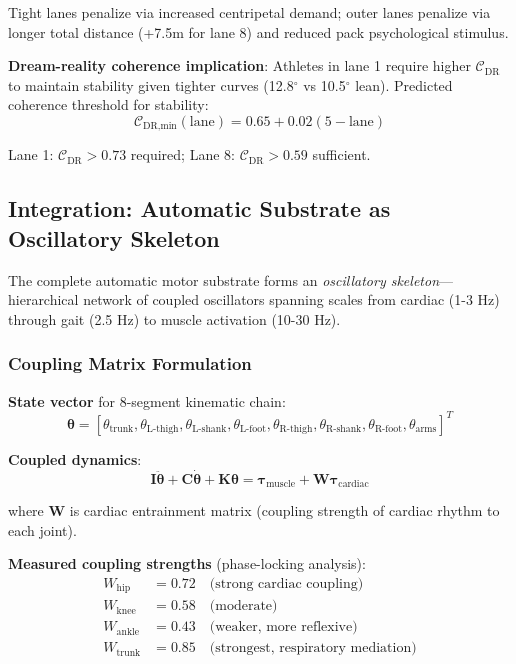 \documentclass[11pt,onecolumn]{article}
\begin{document}
Tight lanes penalize via increased centripetal demand; outer lanes penalize via longer total distance (+7.5m for lane 8) and reduced pack psychological stimulus.

\textbf{Dream-reality coherence implication}: Athletes in lane 1 require higher $\mathcal{C}_{\text{DR}}$ to maintain stability given tighter curves (12.8$^\circ$ vs 10.5$^\circ$ lean). Predicted coherence threshold for stability:
\begin{equation}
\mathcal{C}_{\text{DR,min}}(\text{lane}) = 0.65 + 0.02(5 - \text{lane})
\end{equation}

Lane 1: $\mathcal{C}_{\text{DR}} > 0.73$ required; Lane 8: $\mathcal{C}_{\text{DR}} > 0.59$ sufficient.

\subsection{Integration: Automatic Substrate as Oscillatory Skeleton}

The complete automatic motor substrate forms an \textit{oscillatory skeleton}---hierarchical network of coupled oscillators spanning scales from cardiac (1-3 Hz) through gait (2.5 Hz) to muscle activation (10-30 Hz).

\subsubsection{Coupling Matrix Formulation}

\textbf{State vector} for 8-segment kinematic chain:
\begin{equation}
\boldsymbol{\theta} = [\theta_{\text{trunk}}, \theta_{\text{L-thigh}}, \theta_{\text{L-shank}}, \theta_{\text{L-foot}}, \theta_{\text{R-thigh}}, \theta_{\text{R-shank}}, \theta_{\text{R-foot}}, \theta_{\text{arms}}]^T
\end{equation}

\textbf{Coupled dynamics}:
\begin{equation}
\mathbf{I}\ddot{\boldsymbol{\theta}} + \mathbf{C}\dot{\boldsymbol{\theta}} + \mathbf{K}\boldsymbol{\theta} = \boldsymbol{\tau}_{\text{muscle}} + \mathbf{W}\boldsymbol{\tau}_{\text{cardiac}}
\end{equation}

where $\mathbf{W}$ is cardiac entrainment matrix (coupling strength of cardiac rhythm to each joint).

\textbf{Measured coupling strengths} (phase-locking analysis):
\begin{align}
W_{\text{hip}} &= 0.72 \quad \text{(strong cardiac coupling)} \\
W_{\text{knee}} &= 0.58 \quad \text{(moderate)} \\
W_{\text{ankle}} &= 0.43 \quad \text{(weaker, more reflexive)} \\
W_{\text{trunk}} &= 0.85 \quad \text{(strongest, respiratory mediation)}
\end{align}
\end{document}
